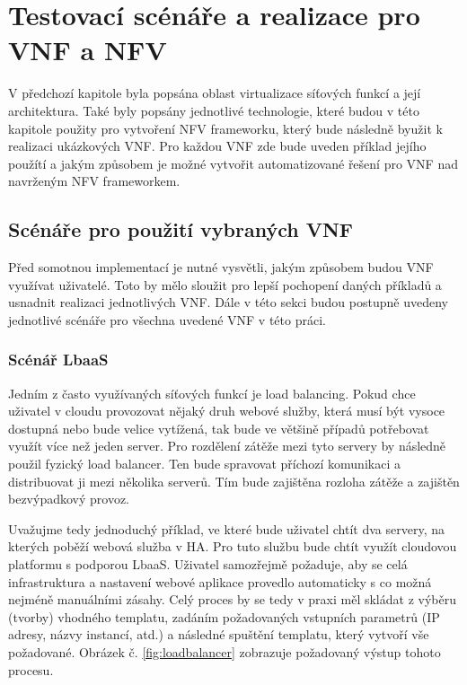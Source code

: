 \chapter{Testovací scénáře a realizace pro VNF a NFV}

V předchozí kapitole byla popsána oblast virtualizace síťových funkcí a její architektura. Také byly popsány jednotlivé technologie, které budou v této kapitole použity pro vytvoření NFV frameworku, který bude následně byužit k realizaci ukázkových VNF. Pro každou VNF zde bude uveden příklad jejího použítí a jakým způsobem je možné vytvořit automatizované řešení pro VNF nad navrženým NFV frameworkem.

\section{Scénáře pro použití vybraných VNF}

Před somotnou implementací je nutné vysvětli, jakým způsobem budou VNF využívat uživatelé. Toto by mělo sloužit pro lepší pochopení daných příkladů a usnadnit realizaci jednotlivých VNF. Dále v této sekci budou postupně uvedeny jednotlivé scénáře pro všechna uvedené VNF v této práci. 

\subsection{Scénář LbaaS}

Jedním z často využívaných síťových funkcí je load balancing. Pokud chce uživatel v cloudu provozovat nějaký druh webové služby, která musí být vysoce dostupná nebo bude velice vytížená, tak bude ve většině případů potřebovat využít více než jeden server. Pro rozdělení zátěže mezi tyto servery by následně použil fyzický load balancer. Ten bude spravovat příchozí komunikaci a distribuovat ji mezi několika serverů. Tím bude zajištěna rozloha zátěže a zajištěn bezvýpadkový provoz.

Uvažujme tedy jednoduchý příklad, ve které bude uživatel chtít dva servery, na kterých poběží webová služba v HA. Pro tuto službu bude chtít využít cloudovou platformu s podporou LbaaS. Uživatel samozřejmě požaduje, aby se celá infrastruktura a nastavení webové aplikace provedlo automaticky s co možná nejméně manuálními zásahy. Celý proces by se tedy v praxi měl skládat z výběru (tvorby) vhodného templatu, zadáním požadovaných vstupních parametrů (IP adresy, názvy instancí, atd.) a následné spuštění templatu, který vytvoří vše požadované. Obrázek č. \ref{fig:loadbalancer} zobrazuje požadovaný výstup tohoto procesu.

